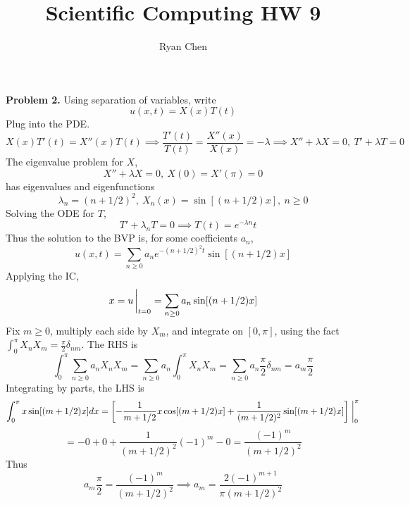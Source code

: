 \documentclass{article}
\title{Scientific Computing HW 9}
\author{Ryan Chen}
\def\tbf#1{\textbf{#1}}
\newcommand{\sbr}[1]{\left[#1\right]}
\newcommand{\imp}{\implies}
\begin{document}
	
\maketitle



\tbf{Problem 2.} Using separation of variables, write
$$u(x,t) = X(x)T(t)$$
Plug into the PDE.
$$X(x)T'(t) = X''(x)T(t)
\imp \frac{T'(t)}{T(t)} = \frac{X''(x)}{X(x)} = -\lambda
\imp X''+\lambda X=0,~T'+\lambda T=0$$
The eigenvalue problem for $X$,
$$X''+\lambda X = 0, ~X(0) = X'(\pi) = 0$$
has eigenvalues and eigenfunctions
$$\lambda_n = (n+1/2)^2,
~X_n(x) = \sin[(n+1/2)x],
~n\ge 0$$
Solving the ODE for $T$,
$$\quad T'+\lambda_n T=0
\imp T(t) = e^{-\lambda n}t$$
Thus the solution to the BVP is, for some coefficients $a_n$,
$$u(x,t) = \sum_{n\ge0}a_ne^{-(n+1/2)^2t}\sin[(n+1/2)x]$$
Applying the IC,
$$x = u\eval_{t=0} = \sum_{n\ge0}a_n\sin[(n+1/2)x]$$
Fix $m\ge0$, multiply each side by $X_m$, and integrate on $[0,\pi]$, using the fact $\int_0^\pi X_nX_m=\frac\pi2\delta_{nm}$. The RHS is
$$\int_0^\pi \sum_{n\ge0}a_nX_nX_m = \sum_{n\ge0}a_n\int_0^\pi X_nX_m
= \sum_{n\ge0}a_n\frac\pi2 \delta_{nm}
= a_m\frac\pi2$$
Integrating by parts, the LHS is
$$\int_0^\pi x\sin[(m+1/2)x]dx = \sbr{-\frac{1}{m+1/2}x\cos[(m+1/2)x] + \frac{1}{(m+1/2)^2}\sin[(m+1/2)x]}\eval_0^\pi$$
$$= -0 + 0 + \frac{1}{(m+1/2)^2}(-1)^{m} - 0
= \frac{(-1)^{m}}{(m+1/2)^2}$$
Thus
$$a_m\frac\pi2 = \frac{(-1)^{m}}{(m+1/2)^2}
\imp a_m = \frac{2(-1)^{m+1}}{\pi(m+1/2)^2}$$


	
\end{document}
